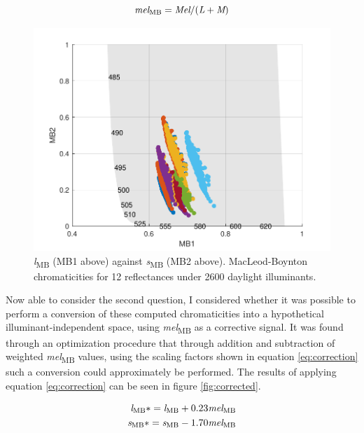 \documentclass{article}
\begin{document}
\begin{equation} \label{eq:m}
\textit{mel}\textsubscript{MB} = \textit{Mel}/(\textit{L}+\textit{M})
\end{equation}

\begin{figure}[ht]
    \centering
    \includegraphics{figs/mb.pdf}
    \caption{\textit{l}\textsubscript{MB} (MB1 above) against \textit{s}\textsubscript{MB} (MB2 above). MacLeod-Boynton chromaticities for 12 reflectances under 2600 daylight illuminants.}
    \label{fig:mb}
\end{figure} 

Now able to consider the second question, I considered whether it was possible to perform a conversion of these computed chromaticities into a hypothetical illuminant-independent space, using \textit{mel}\textsubscript{MB} as a corrective signal. It was found through an optimization procedure that through addition and subtraction of weighted \textit{mel}\textsubscript{MB} values, using the scaling factors shown in equation \ref{eq:correction} such a conversion could approximately be performed. The results of applying equation \ref{eq:correction} can be seen in figure \ref{fig:corrected}.

\begin{subequations} \label{eq:correction}
\begin{align}
\textit{l}\textsubscript{MB}* = \textit{l}\textsubscript{MB} + 0.23\textit{mel}\textsubscript{MB}\\
\textit{s}\textsubscript{MB}* = \textit{s}\textsubscript{MB} - 1.70\textit{mel}\textsubscript{MB}
\end{align}
\end{subequations}
\end{document}
